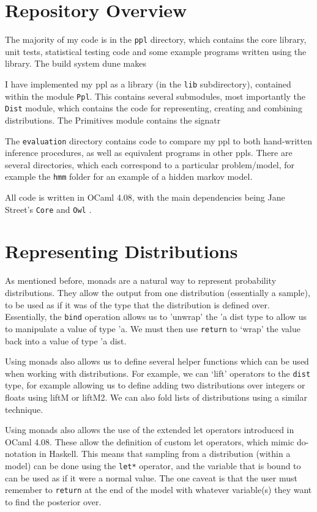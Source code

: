 \section{Repository Overview}

The majority of my code is in the \texttt{ppl} directory, which contains the core library, unit tests, statistical testing code and some example programs written using the library. The build system dune makes 


I have implemented my ppl as a library (in the \texttt{lib} subdirectory), contained within the module \texttt{Ppl}. This contains several submodules, most importantly the \texttt{Dist} module, which contains the code for representing, creating and combining distributions. The Primitives module contains the signatr

The \texttt{evaluation} directory contains code to compare my ppl to both hand-written inference procedures, as well as equivalent programs in other ppls. There are several directories, which each correspond to a particular problem/model, for example the \texttt{hmm} folder for an example of a hidden markov model.

All code is written in OCaml 4.08, with the main dependencies being Jane Street's \texttt{Core} and \texttt{Owl} \cite{owl}.

\section{Representing Distributions}

As mentioned before, monads are a natural way to represent probability distributions. They allow the output from one distribution (essentially a sample), to be used as if it was of the type that the distribution is defined over. Essentially, the \texttt{bind} operation allows us to 'unwrap' the 'a dist type to allow us to manipulate a value of type 'a. We must then use \texttt{return} to `wrap' the value back into a value of type 'a dist.

Using monads also allows us to define several helper functions which can be used when working with distributions. For example, we can `lift' operators to the \texttt{dist} type, for example allowing us to define adding two distributions over integers or floats using liftM or liftM2. We can also fold lists of distributions using a similar technique.

Using monads also allows the use of the extended let operators introduced in OCaml 4.08. These allow the definition of custom let operators, which mimic do-notation in Haskell. This means that sampling from a distribution (within a model) can be done using the \texttt{let*} operator, and the variable that is bound to can be used as if it were a normal value. The one caveat is that the user must remember to \texttt{return} at the end of the model with whatever variable(s) they want to find the posterior over.

